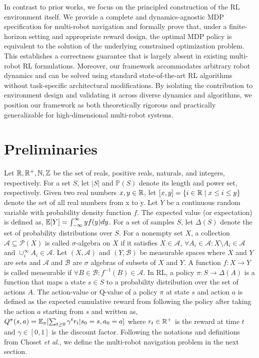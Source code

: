 \documentclass{article}
\begin{document}
In contrast to prior works, we focus on the principled construction of the RL environment itself. We provide a complete and dynamics-agnostic MDP specification for multi-robot navigation and formally prove that, under a finite-horizon setting and appropriate reward design, the optimal MDP policy is equivalent to the solution of the underlying constrained optimization problem. This establishes a correctness guarantee that is largely absent in existing multi-robot RL formulations. Moreover, our framework accommodates arbitrary robot dynamics and can be solved using standard state-of-the-art RL algorithms without task-specific architectural modifications. By isolating the contribution to environment design and validating it across diverse dynamics and algorithms, we position our framework as both theoretically rigorous and practically generalizable for high-dimensional multi-robot systems.

\section{Preliminaries}
\label{sec:background}
Let $\mathbb{R}, \mathbb{R}^+, \mathbb{N}, \mathbb{Z}$ be the set of reals, positive reals, naturals, and integers, respectively. For a set $S$, let $|S|$ and $\mathbb{P}(S)$ denote its length and power set, respectively.  Given two real numbers $x,y \in \mathbb{R}$, let $[x,y] = \{ i \in \mathbb{R} \mid x \leq i \leq y \}$ denote the set of all real numbers from x to y. Let $Y$ be a continuous random variable with probability density function $f$. The expected value (or expectation) is defined as, $\mathbb{E}[Y] = \int_{-\infty}^{\infty} y f(y)dy$. For a set of samples $S$, let $\Delta(S)$ denote the set of probability distributions over $S$. For a nonempty set $X$, a collection $\mathcal{A} \subseteq \mathcal{P}(X)$ is called $\sigma$-algebra \cite{tao2011} on $X$ if it satisfies $X \in \mathcal{A}$, $\forall A_i \in \mathcal{A}: X \setminus A_i \in \mathcal{A}$ and $ \cup_i^{\infty}A_i \in \mathcal{A}$. Let $(X, \mathcal{A})$ and $(Y, \mathcal{B})$ be measurable spaces where $X$ and $Y$ are sets and $\mathcal{A}$ and $\mathcal{B}$ are $\sigma$ algebras of subsets of $X$ and $Y$. A function $f: X \to Y$ is called measurable if $\forall B \in \mathcal{B}: f^{-1}(B)\in \mathcal{A}$. In RL, a policy $\pi: S \to \Delta (A)$ is a function that maps a state $s \in S$ to a probability distribution over the set of actions $A$. The action-value or Q-value of a policy $\pi$ at state $s$ and action $a$ is defined as the expected cumulative reward from following the policy after taking the action $a$ starting from $s$ and written as, $Q^{\pi}(s,a) = \mathbb{E}_{\pi}[\sum_{t\geq0}\gamma^t r_t | s_0=s, a_0=a]$ where $r_t \in \mathbb{R}^+$ is the reward at time $t$ and $\gamma \in [0,1]$ is the discount factor. Following the notations and definitions from Choset \textit{et al.}\cite{choset2005}, we define the multi-robot navigation problem in the next section.
\end{document}
